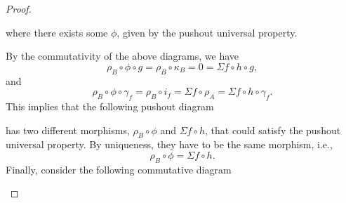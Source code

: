 \begin{proof}
\begin{enumerate}[label={(\bfseries TR\arabic*)}]
{\begin{center}
            \end{center}
            where there exists some \( \phi \), given by the pushout universal property.

            By the commutativity of the above diagrams, we have
            \[
                \rho_B \circ \phi \circ g = \rho_B \circ \kappa_B = 0 = \Sigma f \circ h \circ g,
            \]
            and
            \[
                \rho_B \circ \phi \circ \gamma_f = \rho_B \circ i_f = \Sigma f \circ \rho_A = \Sigma f \circ h \circ \gamma_f.
            \]
            This implies that the following pushout diagram
            \begin{center}
            \end{center}
            has two different morphisms, \( \rho_B \circ \phi \) and \( \Sigma f \circ h \), that could satisfy the pushout universal property. By uniqueness, they have to be the same morphism, i.e.,
            \[
                \rho_B \circ \phi = \Sigma f \circ h.
            \]
            Finally, consider the following commutative diagram
            \begin{center}
\end{center}}
\end{enumerate}
\end{proof}
